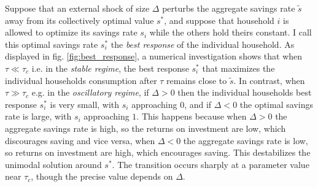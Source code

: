 Suppose that an external shock of size $\Delta$ perturbs the aggregate savings rate $\tilde{s}$ away from its collectively optimal value $s^\ast$, and suppose that household $i$ is allowed to optimize its savings rate $s_i$ while the others hold theirs constant. 
I call this optimal savings rate $s^*_i$ the \emph{best response} of the individual household. 
As displayed in fig. \ref{fig:best_response}, a numerical investigation shows that when $\tau \ll \tau_{c}$ i.e. in the \emph{stable regime}, the best response $s^*_i$ that maximizes the individual households consumption after $\tau$ remains close to $\tilde{s}$. 
In contrast, when  $\tau \gg \tau_{c}$ e.g. in the \emph{oscillatory regime}, if $\Delta > 0$ then the individual households best response $s^*_i$ is very small, with $s_i$ approaching $0$, and if $\Delta < 0$ the optimal savings rate is large, with $s_i$ approaching $1$. 
This happens because when $\Delta > 0$ the aggregate savings rate is high, so the returns on investment are low, which discourages saving and vice versa, when $\Delta < 0$ the aggregate savings rate is low, so returns on investment are high, which encourages saving. 
This destabilizes the unimodal solution around $s^\ast$. 
The transition occurs sharply at a parameter value near $\tau_{c}$, though the precise value depends on $\Delta$.



